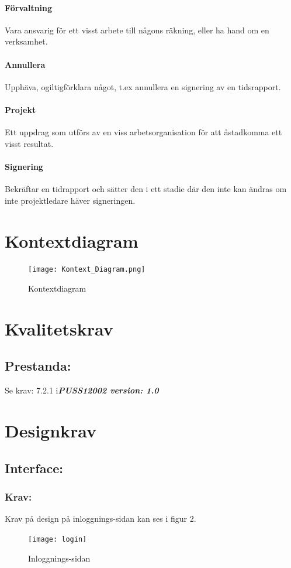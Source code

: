 \documentclass[paper=a4, fontsize=11pt,twoside]{article}
\begin{document}
\paragraph{Förvaltning}
\flushleft
Vara ansvarig för ett visst arbete till någons räkning, eller ha hand om en verksamhet.
\paragraph{Annullera}
\flushleft
Upphäva, ogiltigförklara något, t.ex annullera en signering av en tidsrapport.
\paragraph{Projekt}
\flushleft
Ett uppdrag som utförs av en viss arbetsorganisation för att åstadkomma ett visst resultat. 
\paragraph{Signering}
\flushleft
Bekräftar en tidrapport och sätter den i ett stadie där den inte kan ändras om inte projektledare häver signeringen.

\section{Kontextdiagram}
\begin{figure}[H]
\centering
\texttt{[image: Kontext\_Diagram.png]} 
\caption{Kontextdiagram}
\end{figure}


\section{Kvalitetskrav}
\subsection{Prestanda:}
Se krav: 7.2.1 i\textbf{\textit{PUSS12002 version: 1.0}}


\section{Designkrav}
\subsection{Interface:}
\subsubsection{Krav:} Krav på design på inloggnings-sidan kan ses i figur 2.
\begin{figure}[H]
\centering
\texttt{[image: login]}
\caption{Inloggnings-sidan}
\end{figure}
\end{document}

